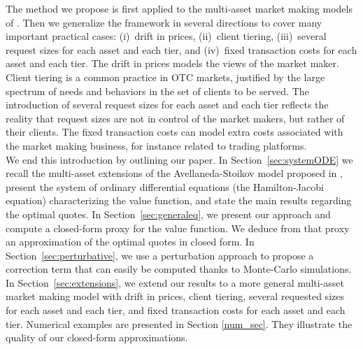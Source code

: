 \documentclass[preprint, 3p]{elsarticle}
\newcommand{\1}{{\chi}}
\begin{document}

The method we propose is first applied to the multi-asset market making models of \cite{gueant2017optimal}. Then we generalize the framework in several directions to cover many important practical cases: (i)~drift in prices, (ii)~client tiering, (iii)~several request sizes for each asset and each tier, and (iv)~fixed transaction costs for each asset and each tier. The drift in prices models the views of the market maker. Client tiering is a common practice in OTC markets, justified by the large spectrum of needs and behaviors in the set of clients to be served. The introduction of several request sizes for each asset and each tier reflects the reality that request sizes are not in control of the market makers, but rather of their clients. The fixed transaction costs can model extra costs associated with the market making business, for instance related to trading platforms.\\

We end this introduction by outlining our paper. In Section~\ref{sec:systemODE} we recall the multi-asset extensions of the Avellaneda-Stoikov model proposed in \cite{gueant2017optimal}, present the system of ordinary differential equations (the Hamilton-Jacobi equation) characterizing the value function, and state the main results regarding the optimal quotes. In Section~\ref{sec:generaleq}, we present our approach and compute a closed-form proxy for the value function. We deduce from that proxy an approximation of the optimal quotes in closed form. In Section~\ref{sec:perturbative}, we use a perturbation approach to propose a correction term that can easily be computed thanks to Monte-Carlo simulations. In Section~\ref{sec:extensions}, we extend our results to a more general multi-asset market making model with drift in prices, client tiering, several requested sizes for each asset and each tier, and fixed transaction costs for each asset and each tier. Numerical examples are presented in Section \ref{num_sec}. They illustrate the quality of our closed-form approximations.\\
\end{document}
